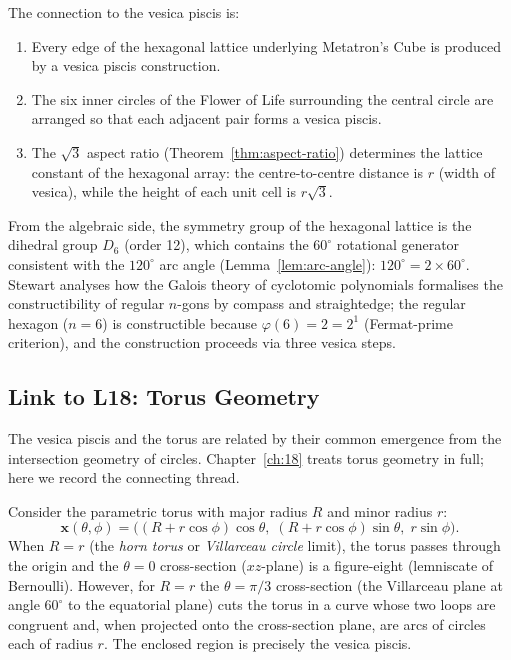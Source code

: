The connection to the vesica piscis is:
\begin{enumerate}
\item Every edge of the hexagonal lattice underlying Metatron's Cube
      is produced by a vesica piscis construction.
\item The six inner circles of the Flower of Life surrounding the
      central circle are arranged so that each adjacent pair forms a
      vesica piscis.
\item The \(\sqrt{3}\) aspect ratio (Theorem~\ref{thm:aspect-ratio})
      determines the lattice constant of the hexagonal array:
      the centre-to-centre distance is \(r\) (width of vesica),
      while the height of each unit cell is \(r\sqrt{3}\).
\end{enumerate}

From the algebraic side, the symmetry group of the hexagonal lattice is
the dihedral group \(D_6\) (order 12), which contains the \(60^\circ\)
rotational generator consistent with the \(120^\circ\) arc angle
(Lemma~\ref{lem:arc-angle}): \(120^\circ = 2 \times 60^\circ\).
Stewart \cite{stewart_galois_theory} analyses how the Galois theory of
cyclotomic polynomials formalises the constructibility of regular
\(n\)-gons by compass and straightedge; the regular hexagon
(\(n=6\)) is constructible because \(\varphi(6) = 2 = 2^1\)
(Fermat-prime criterion), and the construction proceeds via three
vesica steps.

\subsection{Link to L18: Torus Geometry}
\label{subsec:ch11-torus}

The vesica piscis and the torus are related by their common emergence
from the intersection geometry of circles.
Chapter~\ref{ch:18} treats torus geometry in full; here we record the
connecting thread.

Consider the parametric torus with major radius \(R\) and minor radius
\(r\):
\[
  \mathbf{x}(\theta, \phi) = \bigl((R + r\cos\phi)\cos\theta,\;
  (R + r\cos\phi)\sin\theta,\; r\sin\phi\bigr).
\]
When \(R = r\) (the \emph{horn torus} or \emph{Villarceau circle}
limit), the torus passes through the origin and the \(\theta=0\)
cross-section (\(xz\)-plane) is a figure-eight (lemniscate of Bernoulli).
However, for \(R = r\) the \(\theta = \pi/3\) cross-section (the Villarceau
plane at angle \(60^\circ\) to the equatorial plane) cuts the torus in
a curve whose two loops are congruent and, when projected onto the
cross-section plane, are arcs of circles each of radius \(r\).
The enclosed region is precisely the vesica piscis.

